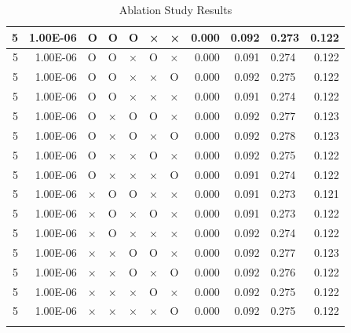 \documentclass[11pt]{article}
\begin{document}
\begin{longtable}[h]{|r|r|l|l|l|l|l|r|r|l|r|}
5 & 1.00E-06 & O & O & O & × & × & 0.000 & 0.092 & 0.273 & 0.122 \\ \hline
5 & 1.00E-06 & O & O & × & O & × & 0.000 & 0.091 & 0.274 & 0.122 \\ \hline
5 & 1.00E-06 & O & O & × & × & O & 0.000 & 0.092 & 0.275 & 0.122 \\ \hline
5 & 1.00E-06 & O & O & × & × & × & 0.000 & 0.091 & 0.274 & 0.122 \\ \hline
5 & 1.00E-06 & O & × & O & O & × & 0.000 & 0.092 & 0.277 & 0.123 \\ \hline
5 & 1.00E-06 & O & × & O & × & O & 0.000 & 0.092 & 0.278 & 0.123 \\ \hline
5 & 1.00E-06 & O & × & × & O & × & 0.000 & 0.092 & 0.275 & 0.122 \\ \hline
5 & 1.00E-06 & O & × & × & × & O & 0.000 & 0.091 & 0.274 & 0.122 \\ \hline
5 & 1.00E-06 & × & O & O & × & × & 0.000 & 0.091 & 0.273 & 0.121 \\ \hline
5 & 1.00E-06 & × & O & × & O & × & 0.000 & 0.091 & 0.273 & 0.122 \\ \hline
5 & 1.00E-06 & × & O & × & × & × & 0.000 & 0.092 & 0.274 & 0.122 \\ \hline
5 & 1.00E-06 & × & × & O & O & × & 0.000 & 0.092 & 0.277 & 0.123 \\ \hline
5 & 1.00E-06 & × & × & O & × & O & 0.000 & 0.092 & 0.276 & 0.122 \\ \hline
5 & 1.00E-06 & × & × & × & O & × & 0.000 & 0.092 & 0.275 & 0.122 \\ \hline
5 & 1.00E-06 & × & × & × & × & O & 0.000 & 0.092 & 0.275 & 0.122 \\ \hline


\caption{Ablation Study Results}
\label{sec:tab_app_ablation}
\end{longtable}
\end{document}
